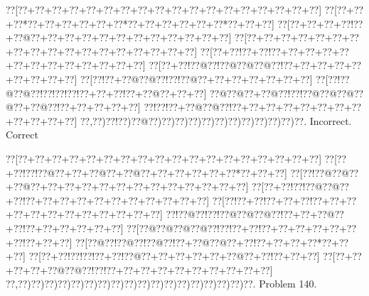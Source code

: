\documentclass[a5paper]{article}
\begin{document}
\begin{center}
{\goo
\0??[\0??+\0??+\0??+\0??+\0??+\0??+\0??+\0??+\0??+\0??+\0??+\0??+\0??+\0??+\0??+\0??+\0??+\0??]
\0??[\0??+\0??+\0??*\0??+\0??+\0??+\0??+\0??+\0??*\0??+\0??+\0??+\0??+\0??+\0??*\0??+\0??+\0??]
\0??[\0??+\0??+\0??+\0??!\0??+\0??@\0??+\0??+\0??+\0??+\0??+\0??+\0??+\0??+\0??+\0??+\0??+\0??]
\0??[\0??+\0??+\0??+\0??+\0??+\0??+\0??+\0??+\0??+\0??+\0??+\0??+\0??+\0??+\0??+\0??+\0??+\0??]
\0??[\0??+\0??!\0??+\0??!\0??+\0??+\0??+\0??+\0??+\0??+\0??+\0??+\0??+\0??+\0??+\0??+\0??]
\0??[\0??+\0??!\0??@\0??!\0??@\0??@\0??@\0??!\0??+\0??+\0??+\0??+\0??+\0??+\0??+\0??+\0??]
\0??[\0??!\0??+\0??@\0??@\0??!\0??!\0??@\0??+\0??+\0??+\0??+\0??+\0??+\0??]
\0??[\0??!\0??@\0??@\0??!\0??!\0??!\0??!\0??+\0??+\0??!\0??+\0??@\0??+\0??+\0??]
\0??@\0??@\0??+\0??@\0??!\0??!\0??@\0??@\0??@\0??@\0??+\0??@\0??!\0??+\0??+\0??+\0??+\0??]
\0??!\0??!\0??+\0??@\0??@\0??!\0??+\0??+\0??+\0??+\0??+\0??+\0??+\0??+\0??+\0??+\0??+\0??]
\0??,\0??)\0??!\0??)\0??@\0??)\0??)\0??)\0??)\0??)\0??)\0??)\0??)\0??)\0??)\0??)\0??.
}
Incorrect. Correct

\end{center}
\newpage
\begin{center}
{\goo
\0??[\0??+\0??+\0??+\0??+\0??+\0??+\0??+\0??+\0??+\0??+\0??+\0??+\0??+\0??+\0??+\0??+\0??+\0??]
\0??[\0??+\0??!\0??!\0??@\0??+\0??+\0??@\0??+\0??@\0??+\0??+\0??+\0??+\0??+\0??*\0??+\0??+\0??]
\0??[\0??!\0??@\0??@\0??+\0??@\0??+\0??+\0??+\0??+\0??+\0??+\0??+\0??+\0??+\0??+\0??+\0??+\0??]
\0??[\0??+\0??!\0??!\0??@\0??@\0??+\0??!\0??+\0??+\0??+\0??+\0??+\0??+\0??+\0??+\0??+\0??+\0??]
\0??[\0??!\0??+\0??!\0??+\0??+\0??!\0??+\0??+\0??+\0??+\0??+\0??+\0??+\0??+\0??+\0??+\0??+\0??]
\0??!\0??@\0??!\0??!\0??@\0??@\0??@\0??!\0??+\0??+\0??@\0??+\0??!\0??+\0??+\0??+\0??+\0??+\0??]
\0??[\0??@\0??@\0??@\0??@\0??!\0??!\0??+\0??!\0??+\0??+\0??+\0??+\0??+\0??+\0??!\0??+\0??+\0??]
\0??[\0??@\0??!\0??@\0??!\0??@\0??!\0??+\0??@\0??@\0??+\0??!\0??+\0??+\0??+\0??*\0??+\0??+\0??]
\0??[\0??+\0??!\0??!\0??!\0??+\0??!\0??@\0??+\0??+\0??+\0??+\0??+\0??@\0??+\0??!\0??+\0??+\0??]
\0??[\0??+\0??+\0??+\0??+\0??@\0??@\0??!\0??!\0??+\0??+\0??+\0??+\0??+\0??+\0??+\0??+\0??+\0??]
\0??,\0??)\0??)\0??)\0??)\0??)\0??)\0??)\0??)\0??)\0??)\0??)\0??)\0??)\0??)\0??)\0??)\0??)\0??.
}
Problem 140.

\end{center}
\end{document}
